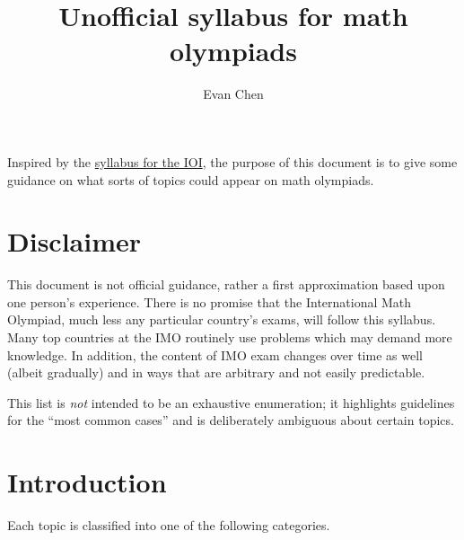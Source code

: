 \documentclass[11pt]{scrartcl}
\begin{document}
\title{Unofficial syllabus for math olympiads}
\author{Evan Chen}
\maketitle

Inspired by the \href{https://ioinformatics.org/files/ioi-syllabus-2019.pdf}
{syllabus for the IOI},
the purpose of this document is to give some guidance
on what sorts of topics could appear on math olympiads.

\section{Disclaimer}
\alert{This document is not official guidance},
rather a first approximation based upon one person's experience.
There is no promise that the International Math Olympiad,
much less any particular country's exams,
will follow this syllabus.
Many top countries at the IMO routinely use problems
which may demand more knowledge.
In addition, the content of IMO exam changes over time as well
(albeit gradually) and in ways that are arbitrary and not easily predictable.

This list is \emph{not} intended to be an exhaustive enumeration;
it highlights guidelines for the ``most common cases''
and is deliberately ambiguous about certain topics.

\section{Introduction}
Each topic is classified into one of the following categories.
\end{document}

